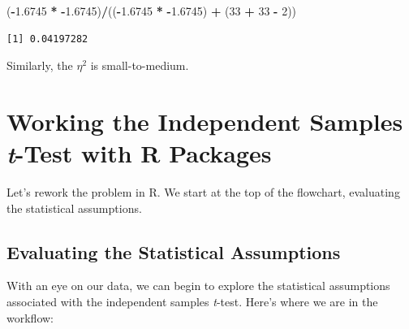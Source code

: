 \documentclass[
  11pt,
]{book}
\newenvironment{Shaded}{\begin{snugshade}}{\end{snugshade}}
\newcommand{\DecValTok}[1]{\textcolor[rgb]{0.06,0.06,0.06}{#1}}
\newcommand{\FloatTok}[1]{\textcolor[rgb]{0.06,0.06,0.06}{#1}}
\newcommand{\NormalTok}[1]{#1}
\newcommand{\SpecialCharTok}[1]{\textcolor[rgb]{0.43,0.43,0.43}{\textbf{#1}}}
\begin{document}
\begin{Shaded}
\begin{Highlighting}[]
\NormalTok{(}\SpecialCharTok{{-}}\FloatTok{1.6745} \SpecialCharTok{*} \SpecialCharTok{{-}}\FloatTok{1.6745}\NormalTok{)}\SpecialCharTok{/}\NormalTok{((}\SpecialCharTok{{-}}\FloatTok{1.6745} \SpecialCharTok{*} \SpecialCharTok{{-}}\FloatTok{1.6745}\NormalTok{) }\SpecialCharTok{+}\NormalTok{ (}\DecValTok{33} \SpecialCharTok{+} \DecValTok{33} \SpecialCharTok{{-}} \DecValTok{2}\NormalTok{))}
\end{Highlighting}
\end{Shaded}

\begin{verbatim}
[1] 0.04197282
\end{verbatim}

Similarly, the \(\eta^2\) is small-to-medium.

\hypertarget{working-the-independent-samples-t-test-with-r-packages}{%
\section{\texorpdfstring{Working the Independent Samples \emph{t}-Test with R Packages}{Working the Independent Samples t-Test with R Packages}}\label{working-the-independent-samples-t-test-with-r-packages}}

Let's rework the problem in R. We start at the top of the flowchart, evaluating the statistical assumptions.

\hypertarget{evaluating-the-statistical-assumptions-1}{%
\subsection{Evaluating the Statistical Assumptions}\label{evaluating-the-statistical-assumptions-1}}

With an eye on our data, we can begin to explore the statistical assumptions associated with the independent samples \emph{t}-test. Here's where we are in the workflow:
\end{document}
